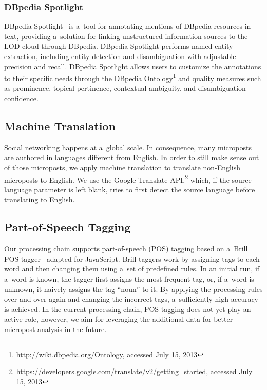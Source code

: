 \subsubsection{DBpedia Spotlight}

DBpedia Spotlight~\cite{mendes2011dbpediaspotlight}
is a~tool for annotating mentions of DBpedia resources in text,
providing a~solution for linking unstructured information sources
to the LOD cloud through DBpedia.
DBpedia Spotlight performs named entity extraction,
including entity detection and disambiguation
with adjustable precision and recall.
DBpedia Spotlight allows users to customize the annotations
to their specific needs through the DBpedia
Ontology\footnote{\url{http://wiki.dbpedia.org/Ontology},
accessed July 15, 2013}
and quality measures such as prominence, topical pertinence,
contextual ambiguity, and disambiguation confidence.

\subsection{Machine Translation}
\label{sec:machine-translation}

Social networking happens at a~global scale.
In consequence, many microposts are authored
in languages different from English.
In order to still make sense out of those microposts,
we apply machine translation to translate non-English microposts
to English.
We use the Google Translate
API,\footnote{\url{https://developers.google.com/translate/v2/getting_started},
accessed July 15, 2013}
which, if the source language parameter is left blank,
tries to first detect the source language
before translating to English.

\subsection{Part-of-Speech Tagging}
\label{sec:part-of-speech-tagging}

Our processing chain supports part-of-speech (POS) tagging
based on a~Brill POS tagger~\cite{brill1992pos} adapted for JavaScript.
Brill taggers work by assigning tags to each word and then changing them
using a~set of predefined rules.
In an initial run, if a~word is known, the tagger
first assigns the most frequent tag,
or, if a~word is unknown, it naively assigns the tag ``noun'' to it.
By applying the processing rules over and over again and
changing the incorrect tags, a~sufficiently high accuracy is achieved.
In the current processing chain, POS tagging does not yet
play an active role,
however, we aim for leveraging the additional data
for better micropost analysis in the future.

